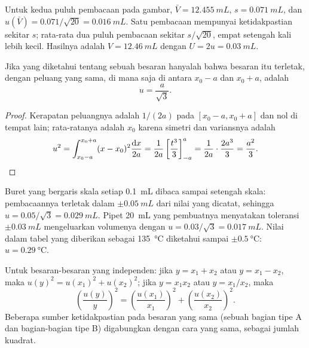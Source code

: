 \begin{example}
Untuk kedua puluh pembacaan pada gambar, $\bar V = \qty{12.455}{mL}$,
$s = \qty{0.071}{mL}$, dan $u(\bar V) = 0.071/\sqrt{20} = \qty{0.016}{mL}$.
Satu pembacaan mempunyai ketidakpastian sekitar $s$; rata-rata dua puluh
pembacaan sekitar
$s/\sqrt{20}$, empat setengah kali lebih kecil. Hasilnya adalah
$V = \qty{12.46}{mL}$ dengan $U = 2u = \qty{0.03}{mL}$.
\end{example}

\begin{proposition}\label{prop:b1:lab-techniques-1:type-b}
Jika yang diketahui tentang sebuah besaran hanyalah bahwa besaran itu
terletak, dengan peluang yang sama, di mana saja di antara $x_0 - a$ dan
$x_0 + a$,  adalah
\[
  u = \frac{a}{\sqrt3}.
\]
\end{proposition}
\begin{proof}
Kerapatan peluangnya adalah $1/(2a)$ pada $[x_0 - a, x_0 + a]$ dan nol di
tempat lain; rata-ratanya adalah $x_0$ karena simetri dan variansnya adalah
\[
  u^2 = \int_{x_0-a}^{x_0+a} (x - x_0)^2 \frac{\mathrm{d}x}{2a}
      = \frac{1}{2a} \left[\frac{t^3}{3}\right]_{-a}^{a}
      = \frac{1}{2a}\cdot\frac{2a^3}{3} = \frac{a^2}{3}. \qedhere
\]
\end{proof}

\begin{example}
Buret yang bergaris skala setiap \qty{0.1}{mL} dibaca sampai setengah
skala: pembacaannya terletak dalam $\pm\qty{0.05}{mL}$ dari nilai yang
dicatat, sehingga
$u = 0.05/\sqrt3 = \qty{0.029}{mL}$. Pipet \qty{20}{mL} yang pembuatnya
menyatakan toleransi $\pm\qty{0.03}{mL}$ mengeluarkan volumenya dengan
$u = 0.03/\sqrt3 = \qty{0.017}{mL}$. Nilai dalam tabel yang diberikan
sebagai \qty{135}{\celsius} diketahui sampai $\pm\qty{0.5}{\celsius}$: $u = \qty{0.29}{\celsius}$.
\end{example}

\begin{proposition}\label{prop:b1:lab-techniques-1:combine}
Untuk besaran-besaran yang independen: jika $y = x_1 + x_2$ atau $y = x_1 - x_2$, maka
$u(y)^2 = u(x_1)^2 + u(x_2)^2$; jika $y = x_1 x_2$ atau $y = x_1/x_2$, maka
\[
  \left(\frac{u(y)}{y}\right)^2 = \left(\frac{u(x_1)}{x_1}\right)^2
  + \left(\frac{u(x_2)}{x_2}\right)^2 .
\]
Beberapa sumber ketidakpastian pada besaran yang sama (sebuah bagian
tipe A dan bagian-bagian tipe B) digabungkan dengan cara yang sama,
sebagai jumlah kuadrat.
\end{proposition}
\admitted


